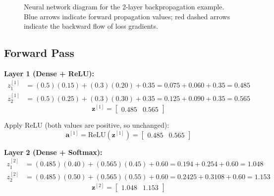 \documentclass[12pt, a4paper]{report}
\theoremstyle{definition}
\begin{document}
\begin{figure}[H]
\caption{Neural network diagram for the 2-layer backpropagation example. Blue arrows indicate forward propagation values; red dashed arrows indicate the backward flow of loss gradients.}
\label{fig:backprop_nn_diagram}
\end{figure}

\subsection{Forward Pass}

\textbf{Layer 1 (Dense + ReLU):}
\begin{align*}
z_1^{[1]} &= (0.5)(0.15) + (0.3)(0.20) + 0.35 = 0.075 + 0.060 + 0.35 = 0.485 \\
z_2^{[1]} &= (0.5)(0.25) + (0.3)(0.30) + 0.35 = 0.125 + 0.090 + 0.35 = 0.565
\end{align*}
\[
\mathbf{z}^{[1]} = \begin{bmatrix} 0.485 & 0.565 \end{bmatrix}
\]

Apply ReLU (both values are positive, so unchanged):
\[
\mathbf{a}^{[1]} = \text{ReLU}(\mathbf{z}^{[1]}) = \begin{bmatrix} 0.485 & 0.565 \end{bmatrix}
\]

\textbf{Layer 2 (Dense + Softmax):}
\begin{align*}
z_1^{[2]} &= (0.485)(0.40) + (0.565)(0.45) + 0.60 = 0.194 + 0.254 + 0.60 = 1.048 \\
z_2^{[2]} &= (0.485)(0.50) + (0.565)(0.55) + 0.60 = 0.2425 + 0.3108 + 0.60 = 1.153
\end{align*}
\[
\mathbf{z}^{[2]} = \begin{bmatrix} 1.048 & 1.153 \end{bmatrix}
\]
\end{document}
